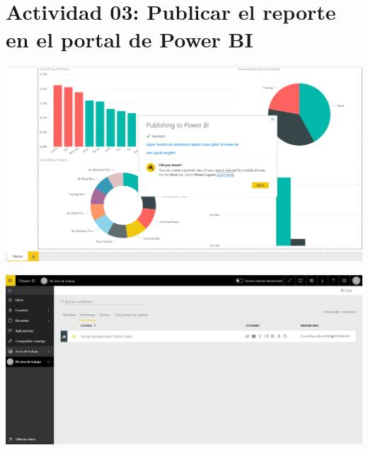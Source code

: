 \section{Actividad 03: Publicar el reporte en el portal de Power BI} 

	\begin{center}
	\includegraphics[width=17cm]{./Imagenes/Img3}
	\end{center}	


	\begin{center}
	\includegraphics[width=18cm]{./Imagenes/Img4}
	\end{center}	